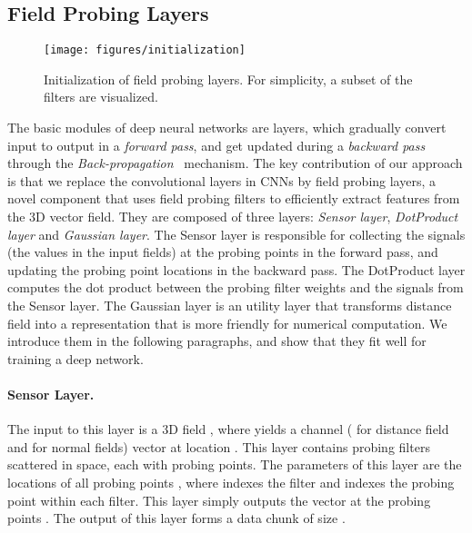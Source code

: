 \documentclass{article}
\begin{document}
\subsection{Field Probing Layers}
\label{sec:fpnn_layers}

\begin{wrapfigure}{R}{0.5\linewidth}
	\vspace{-1.8cm}
	\begin{center}
		\texttt{[image: figures/initialization]}
	\end{center}
	\vspace{-0.4cm}
	\caption{Initialization of field probing layers. For simplicity, a subset of the filters are visualized.}
	\label{fig:initialization}
	\vspace{-0.3cm}
\end{wrapfigure}

The basic modules of deep neural networks are layers, which gradually convert input to output in a \emph{forward pass}, and get updated during a \emph{backward pass} through the \emph{Back-propagation}~\cite{Williams_Nature86_Learning} mechanism.
The key contribution of our approach is that we replace the convolutional layers in CNNs by field probing layers, a novel component that uses field probing filters to efficiently extract features from the 3D vector field. They are composed of three layers: \emph{Sensor layer}, \emph{DotProduct layer} and \emph{Gaussian layer}. The Sensor layer is responsible for collecting the signals (the values in the input fields) at the probing points in the forward pass, and updating the probing point locations in the backward pass. The DotProduct layer computes the dot product between the probing filter weights and the signals from the Sensor layer. The Gaussian layer is an utility layer that transforms distance field into a representation that is more friendly for numerical computation. We introduce them in the following paragraphs, and show that they fit well for training a deep network.

\paragraph{Sensor Layer.} The input to this layer is a 3D field , where  yields a  channel ( for distance field and  for normal fields) vector at location . This layer contains  probing filters scattered in space, each with  probing points. The parameters of this layer are the locations of all probing points , where  indexes the filter and  indexes the probing point within each filter. This layer simply outputs the vector at the probing points . The output of this layer forms a data chunk of size .
\end{document}
